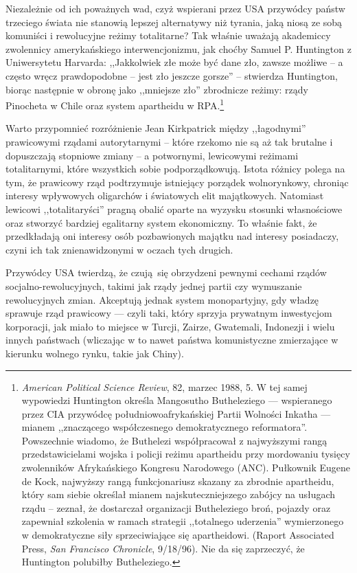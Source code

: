 \documentclass[12pt]{book}
\begin{document}
Niezależnie od ich poważnych wad, czyż wspierani przez USA przywódcy państw trzeciego świata nie stanowią lepszej alternatywy niż tyrania, jaką niosą ze sobą komuniści i rewolucyjne reżimy totalitarne? Tak właśnie uważają akademiccy zwolennicy amerykańskiego interwencjonizmu, jak choćby Samuel P. Huntington z Uniwersytetu Harvarda: ,,Jakkolwiek złe może być dane zło, zawsze możliwe – a często wręcz prawdopodobne – jest zło jeszcze gorsze'' – stwierdza Huntington, biorąc następnie w obronę jako ,,mniejsze zło'' zbrodnicze reżimy: rządy Pinocheta w Chile oraz system apartheidu w RPA.\footnote{\textit{American Political Science Review}, 82, marzec 1988, 5. W tej samej wypowiedzi Huntington określa Mangosutho Butheleziego — wspieranego przez CIA przywódcę południowoafrykańskiej Partii Wolności Inkatha — mianem ,,znaczącego współczesnego demokratycznego reformatora''. Powszechnie wiadomo, że Buthelezi współpracował z najwyższymi rangą przedstawicielami wojska i policji reżimu apartheidu przy mordowaniu tysięcy zwolenników Afrykańskiego Kongresu Narodowego (ANC). Pułkownik Eugene de Kock, najwyższy rangą funkcjonariusz skazany za zbrodnie apartheidu, który sam siebie określał mianem najskuteczniejszego zabójcy na usługach rządu – zeznał, że dostarczał organizacji Butheleziego broń, pojazdy oraz zapewniał szkolenia w ramach strategii ,,totalnego uderzenia'' wymierzonego w demokratyczne siły sprzeciwiające się apartheidowi. (Raport Associated Press, \textit{San Francisco Chronicle}, 9/18/96). Nie da się zaprzeczyć, że Huntington polubiłby Butheleziego.}

Warto przypomnieć rozróżnienie Jean Kirkpatrick między ,,łagodnymi'' prawicowymi rządami autorytarnymi – które rzekomo nie są aż tak brutalne i dopuszczają stopniowe zmiany – a potwornymi, lewicowymi reżimami totalitarnymi, które wszystkich sobie podporządkowują. Istota różnicy polega na tym, że prawicowy rząd podtrzymuje istniejący porządek wolnorynkowy, chroniąc interesy wpływowych oligarchów i światowych elit majątkowych. Natomiast lewicowi ,,totalitaryści'' pragną obalić oparte na wyzysku stosunki własnościowe oraz stworzyć bardziej egalitarny system ekonomiczny. To właśnie fakt, że przedkładają oni interesy osób pozbawionych majątku nad interesy posiadaczy, czyni ich tak znienawidzonymi w oczach tych drugich.

Przywódcy USA twierdzą, że czują się obrzydzeni pewnymi cechami rządów socjalno-rewolucyjnych, takimi jak rządy jednej partii czy wymuszanie rewolucyjnych zmian. Akceptują jednak system monopartyjny, gdy władzę sprawuje rząd prawicowy — czyli taki, który sprzyja prywatnym inwestycjom korporacji, jak miało to miejsce w Turcji, Zairze, Gwatemali, Indonezji i wielu innych państwach (wliczając w to nawet państwa komunistyczne zmierzające w kierunku wolnego rynku, takie jak Chiny).
\end{document}
